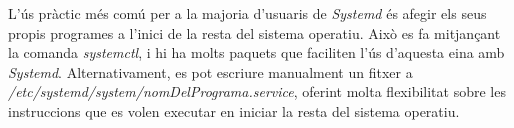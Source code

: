 L'ús pràctic més comú per a la majoria d'usuaris de \textit{Systemd} és afegir els seus propis programes a l'inici de la resta del sistema operatiu. Això es fa mitjançant la comanda \textit{systemctl}, i hi ha molts paquets que faciliten l'ús d'aquesta eina amb \textit{Systemd}. Alternativament, es pot escriure manualment un fitxer a \textit{/etc/systemd/system/nomDelPrograma.service}, oferint molta flexibilitat sobre les instruccions que es volen executar en iniciar la resta del sistema operatiu.\cite{morel_creating_2019}